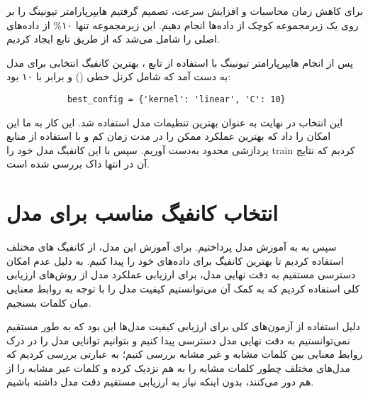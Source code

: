 \documentclass[a4paper,12pt]{article}
\begin{document}
	
	برای کاهش زمان محاسبات و افزایش سرعت، تصمیم گرفتیم هایپرپارامتر تیونینگ را 
	بر روی یک زیرمجموعه کوچک از داده‌ها انجام دهیم. این زیرمجموعه تنها ۱۰\% از 
	داده‌های اصلی را شامل می‌شد که از طریق تابع  ایجاد 
	کردیم.
	
	
	پس از انجام هایپرپارامتر تیونینگ با استفاده از تابع 
	، بهترین کانفیگ انتخابی برای مدل 
	 به دست آمد که شامل کرنل خطی () و  برابر با ۱۰ بود:
	
	\begin{latin}
		\begin{verbatim}
			best_config = {'kernel': 'linear', 'C': 10}
		\end{verbatim}
	\end{latin}
	
	این انتخاب در نهایت به عنوان بهترین تنظیمات مدل استفاده شد. این کار به ما این امکان 
	را داد که بهترین عملکرد ممکن را در مدت زمان کم و با استفاده از منابع پردازشی 
	محدود به‌دست آوریم. سپس با این کانفیگ مدل خود را train کردیم که نتایج آن در انتها داک بررسی شده است.
	
	
	
	\section*{انتخاب کانفیگ مناسب برای مدل }
	
	سپس به به آموزش مدل  پرداختیم. برای آموزش این مدل، از 
	کانفیگ های مختلف استفاده کردیم تا بهترین کانفیگ برای داده‌های خود را پیدا کنیم.
	به دلیل عدم امکان دسترسی مستقیم به دقت نهایی مدل، برای ارزیابی عملکرد مدل از 
	روش‌های ارزیابی کلی استفاده کردیم که به کمک آن می‌توانستیم کیفیت مدل را با توجه 
	به روابط معنایی میان کلمات بسنجیم.
	
	دلیل استفاده از آزمون‌های کلی برای ارزیابی کیفیت مدل‌ها این بود که به طور مستقیم 
	نمی‌توانستیم به دقت نهایی مدل دسترسی پیدا کنیم و بتوانیم توانایی مدل را در درک روابط معنایی 
	بین کلمات مشابه و غیر مشابه بررسی کنیم؛ به عبارتی بررسی کردیم که 
	مدل‌های مختلف چطور کلمات مشابه را به هم نزدیک کرده و کلمات غیر مشابه را از 
	هم دور می‌کنند، بدون اینکه نیاز به ارزیابی مستقیم دقت مدل داشته باشیم.
	
\end{document}
